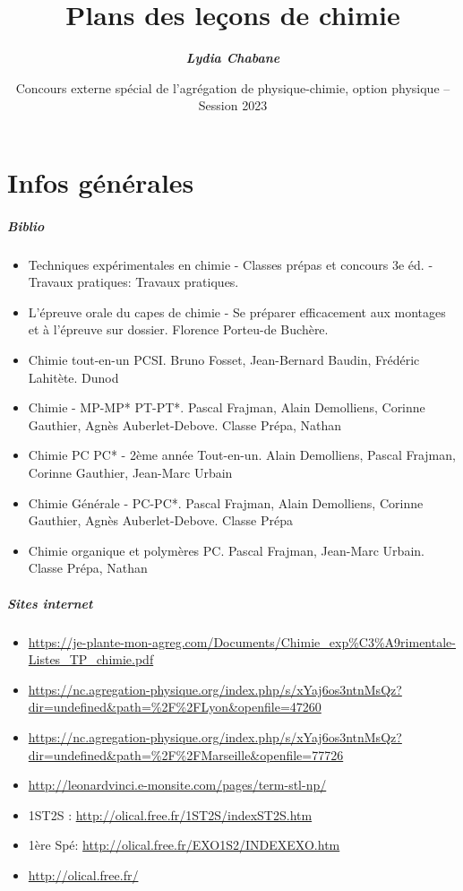 \documentclass[11pt]{report}
\title{\textbf{Plans des leçons de chimie}}
\date{Concours externe spécial de l'agrégation de physique-chimie, option physique -- Session 2023}
\author{\color{mycolor2}\bfseries \textit{Lydia Chabane}}
\numberwithin{figure}{section}
\numberwithin{equation}{section}
\numberwithin{table}{section}
\newcommand{\1}{\boldsymbol{1}}
\begin{document}
\maketitle


\begingroup
\hypersetup{linkcolor=black}
\tableofcontents
\endgroup




\chapter{Infos générales}

\paragraph{Biblio}
\begin{itemize}
\item Techniques expérimentales en chimie - Classes prépas et concours 3e éd. - Travaux pratiques: Travaux pratiques.
\item L'épreuve orale du capes de chimie - Se préparer efficacement aux montages et à l'épreuve sur dossier. Florence Porteu-de Buchère.
\item Chimie tout-en-un PCSI. Bruno Fosset, Jean-Bernard Baudin, Frédéric Lahitète. Dunod
\item Chimie - MP-MP* PT-PT*.  Pascal Frajman, Alain Demolliens, Corinne Gauthier, Agnès Auberlet-Debove. Classe Prépa, Nathan
\item Chimie PC PC* - 2ème année Tout-en-un. Alain Demolliens, Pascal Frajman, Corinne Gauthier, Jean-Marc Urbain
\item Chimie Générale - PC-PC*. Pascal Frajman, Alain Demolliens, Corinne Gauthier, Agnès Auberlet-Debove. Classe Prépa
\item Chimie organique et polymères PC. Pascal Frajman, Jean-Marc Urbain. Classe Prépa, Nathan
\end{itemize}

\paragraph{Sites internet}
\begin{itemize}
\item \url{https://je-plante-mon-agreg.com/Documents/Chimie_exp%C3%A9rimentale-Listes_TP_chimie.pdf}
\item \url{https://nc.agregation-physique.org/index.php/s/xYaj6os3ntnMsQz?dir=undefined&path=%2F%2FLyon&openfile=47260}
\item \url{https://nc.agregation-physique.org/index.php/s/xYaj6os3ntnMsQz?dir=undefined&path=%2F%2FMarseille&openfile=77726}
\item \url{http://leonardvinci.e-monsite.com/pages/term-stl-np/}
\item 1ST2S : \url{http://olical.free.fr/1ST2S/indexST2S.htm}
\item 1ère Spé: \url{http://olical.free.fr/EXO1S2/INDEXEXO.htm}
\item \url{http://olical.free.fr/}
\end{itemize}
\end{document}
